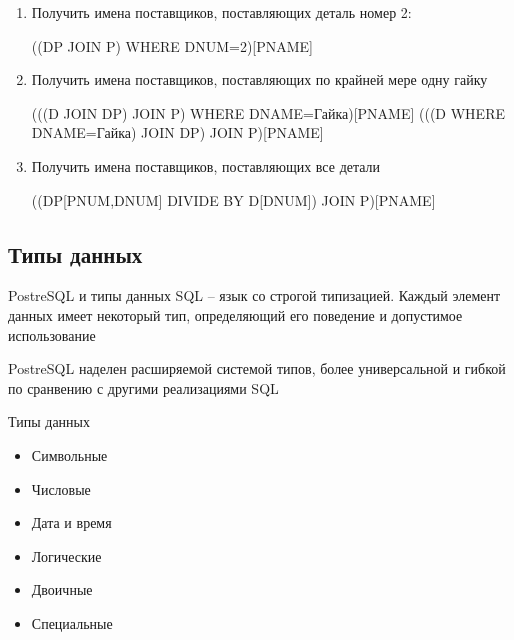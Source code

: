 \documentclass[12pt]{article}
\begin{document}
\begin{Example}{}
    \begin{enumerate}
        \item Получить имена поставщиков, поставляющих деталь номер 2:
        
        ((DP JOIN P) WHERE DNUM=2)[PNAME]

        \item Получить имена поставщиков, поставляющих по крайней мере одну гайку 
        
        (((D JOIN DP) JOIN P) WHERE DNAME=Гайка)[PNAME]
        (((D WHERE DNAME=Гайка) JOIN DP) JOIN P)[PNAME]

        \item Получить имена поставщиков, поставляющих все детали 
        
        ((DP[PNUM,DNUM] DIVIDE BY D[DNUM]) JOIN P)[PNAME]
    \end{enumerate}
\end{Example}

\newpage

\subsection{Типы данных}

\begin{defin}{PostreSQL и типы данных}
    SQL -- язык со строгой типизацией. Каждый элемент данных имеет некоторый тип, определяющий его поведение и допустимое использование 

    PostreSQL наделен расширяемой системой типов, более универсальной и гибкой по сранвению с другими реализациями SQL 
\end{defin}

\begin{nota}{Типы данных}
    \begin{itemize}
        \item Символьные 
        \item Числовые 
        \item Дата и время 
        \item Логические 
        \item Двоичные 
        \item Специальные 
    \end{itemize}
\end{nota}
\end{document}
